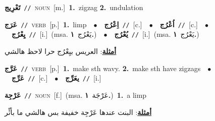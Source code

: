 \documentclass[10pt,a4paper,twoside]{article} %
\begin{document}
\begin{multicols}{2}
{\setlength\topsep{0pt}\textbf{\foreignlanguage{arabic}{تَعْرِيج}}\ {\color{gray}\texttt{//}\color{black}}\ \textsc{noun}\ [m.]\ \textbf{1.}~zigzag  \textbf{2.}~undulation\ } \vspace{2mm}

{\setlength\topsep{0pt}\textbf{\foreignlanguage{arabic}{عَرَج}}\ {\color{gray}\texttt{//}\color{black}}\ \textsc{verb}\ [p.]\ \textbf{1.}~limp\ \ $\bullet$\ \ \setlength\topsep{0pt}\textbf{\foreignlanguage{arabic}{اِعْرُج}}\ {\color{gray}\texttt{//}\color{black}}\ [c.]\ \ $\bullet$\ \ \setlength\topsep{0pt}\textbf{\foreignlanguage{arabic}{اُعْرُج}}\ {\color{gray}\texttt{//}\color{black}}\ [c.]\ \ $\bullet$\ \ \setlength\topsep{0pt}\textbf{\foreignlanguage{arabic}{يِعْرُج}}\ {\color{gray}\texttt{//}\color{black}}\ [i.]\ \color{gray}(msa. \foreignlanguage{arabic}{يَعْرُج}~\foreignlanguage{arabic}{\textbf{١.}})\color{black}\ \ $\bullet$\ \ \setlength\topsep{0pt}\textbf{\foreignlanguage{arabic}{يُعْرُج}}\ {\color{gray}\texttt{//}\color{black}}\ [i.]\ \color{gray}(msa. \foreignlanguage{arabic}{يَعْرُج}~\foreignlanguage{arabic}{\textbf{١.}})\color{black}\  \begin{flushright}\color{gray}\foreignlanguage{arabic}{\textbf{\underline{\foreignlanguage{arabic}{أمثلة}}}: العريس بيِعْرُج حرا لاحظ هالشي}\end{flushright}\color{black}} \vspace{2mm}

{\setlength\topsep{0pt}\textbf{\foreignlanguage{arabic}{عَرَّج}}\ {\color{gray}\texttt{//}\color{black}}\ \textsc{verb}\ [p.]\ \textbf{1.}~make sth wavy.  \textbf{2.}~make sth have zigzags\ \ $\bullet$\ \ \setlength\topsep{0pt}\textbf{\foreignlanguage{arabic}{عَرِّج}}\ {\color{gray}\texttt{//}\color{black}}\ [c.]\ \ $\bullet$\ \ \setlength\topsep{0pt}\textbf{\foreignlanguage{arabic}{يعَرِّج}}\ {\color{gray}\texttt{//}\color{black}}\ [i.]\ } \vspace{2mm}

{\setlength\topsep{0pt}\textbf{\foreignlanguage{arabic}{عَرْجِة}}\ {\color{gray}\texttt{//}\color{black}}\ \textsc{noun}\ [f.]\ \color{gray}(msa. \foreignlanguage{arabic}{عَرْجَة}~\foreignlanguage{arabic}{\textbf{١.}})\color{black}\ \textbf{1.}~a limp\  \begin{flushright}\color{gray}\foreignlanguage{arabic}{\textbf{\underline{\foreignlanguage{arabic}{أمثلة}}}: البنت عندها عَرْجِة خفيفة بس هالشي ما بأثِّر}\end{flushright}\color{black}} \vspace{2mm}


\end{multicols}
\end{document}
